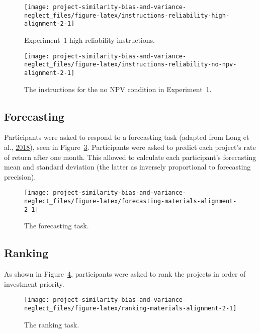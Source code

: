 \documentclass[
  english,
  man, donotrepeattitle,floatsintext]{apa7}
\theoremstyle{definition}
\theoremstyle{definition}
\theoremstyle{definition}
\theoremstyle{definition}
\theoremstyle{remark}
\begin{document}
\begin{figure}
\texttt{[image: project-similarity-bias-and-variance-neglect\_files/figure-latex/instructions-reliability-high-alignment-2-1]} \caption{Experiment~1 high reliability instructions.}\label{fig:instructions-reliability-high-alignment-2}
\end{figure}



\begin{figure}
\texttt{[image: project-similarity-bias-and-variance-neglect\_files/figure-latex/instructions-reliability-no-npv-alignment-2-1]} \caption{The instructions for the no NPV condition in Experiment~1.}\label{fig:instructions-reliability-no-npv-alignment-2}
\end{figure}

\hypertarget{forecasting-materials-alignment-2}{%
\subsection{Forecasting}\label{forecasting-materials-alignment-2}}

Participants were asked to respond to a forecasting task (adapted from Long et al., \protect\hyperlink{ref-long2018}{2018}), seen in Figure~\ref{fig:forecasting-materials-alignment-2}.
Participants were asked to predict each project's rate of return after one
month. This allowed to calculate each participant's forecasting mean and
standard deviation (the latter as inversely proportional to forecasting
precision).



\begin{figure}
\texttt{[image: project-similarity-bias-and-variance-neglect\_files/figure-latex/forecasting-materials-alignment-2-1]} \caption{The forecasting task.}\label{fig:forecasting-materials-alignment-2}
\end{figure}

\hypertarget{ranking-materials-alignment-2}{%
\subsection{Ranking}\label{ranking-materials-alignment-2}}

As shown in Figure~\ref{fig:ranking-materials-alignment-2}, participants were
asked to rank the projects in order of investment priority.



\begin{figure}
\texttt{[image: project-similarity-bias-and-variance-neglect\_files/figure-latex/ranking-materials-alignment-2-1]} \caption{The ranking task.}\label{fig:ranking-materials-alignment-2}
\end{figure}
\end{document}
